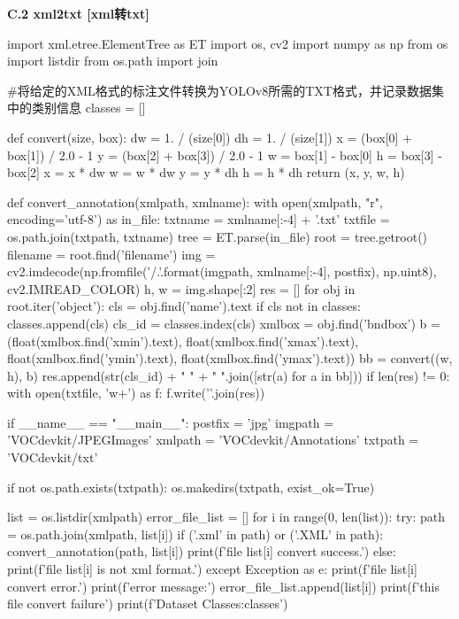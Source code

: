 \documentclass{MathorCupmodeling}
\begin{document}
\textbf{C.2 xml2txt [xml转txt]}
\begin{python}
import xml.etree.ElementTree as ET
import os, cv2
import numpy as np
from os import listdir
from os.path import join

#将给定的XML格式的标注文件转换为YOLOv8所需的TXT格式，并记录数据集中的类别信息
classes = []

def convert(size, box):
    dw = 1. / (size[0])
    dh = 1. / (size[1])
    x = (box[0] + box[1]) / 2.0 - 1
    y = (box[2] + box[3]) / 2.0 - 1
    w = box[1] - box[0]
    h = box[3] - box[2]
    x = x * dw
    w = w * dw
    y = y * dh
    h = h * dh
    return (x, y, w, h)


def convert_annotation(xmlpath, xmlname):
    with open(xmlpath, "r", encoding='utf-8') as in_file:
        txtname = xmlname[:-4] + '.txt'
        txtfile = os.path.join(txtpath, txtname)
        tree = ET.parse(in_file)
        root = tree.getroot()
        filename = root.find('filename')
        img = cv2.imdecode(np.fromfile('{}/{}.{}'.format(imgpath, xmlname[:-4], postfix), np.uint8), cv2.IMREAD_COLOR)
        h, w = img.shape[:2]
        res = []
        for obj in root.iter('object'):
            cls = obj.find('name').text
            if cls not in classes:
                classes.append(cls)
            cls_id = classes.index(cls)
            xmlbox = obj.find('bndbox')
            b = (float(xmlbox.find('xmin').text), float(xmlbox.find('xmax').text), float(xmlbox.find('ymin').text),
                 float(xmlbox.find('ymax').text))
            bb = convert((w, h), b)
            res.append(str(cls_id) + " " + " ".join([str(a) for a in bb]))
        if len(res) != 0:
            with open(txtfile, 'w+') as f:
                f.write('\n'.join(res))


if __name__ == "__main__":
    postfix = 'jpg'
    imgpath = 'VOCdevkit/JPEGImages'
    xmlpath = 'VOCdevkit/Annotations'
    txtpath = 'VOCdevkit/txt'
    
    if not os.path.exists(txtpath):
        os.makedirs(txtpath, exist_ok=True)
    
    list = os.listdir(xmlpath)
    error_file_list = []
    for i in range(0, len(list)):
        try:
            path = os.path.join(xmlpath, list[i])
            if ('.xml' in path) or ('.XML' in path):
                convert_annotation(path, list[i])
                print(f'file {list[i]} convert success.')
            else:
                print(f'file {list[i]} is not xml format.')
        except Exception as e:
            print(f'file {list[i]} convert error.')
            print(f'error message:')
            error_file_list.append(list[i])
    print(f'this file convert failure')
    print(f'Dataset Classes:{classes}')
\end{python}
\end{document}
